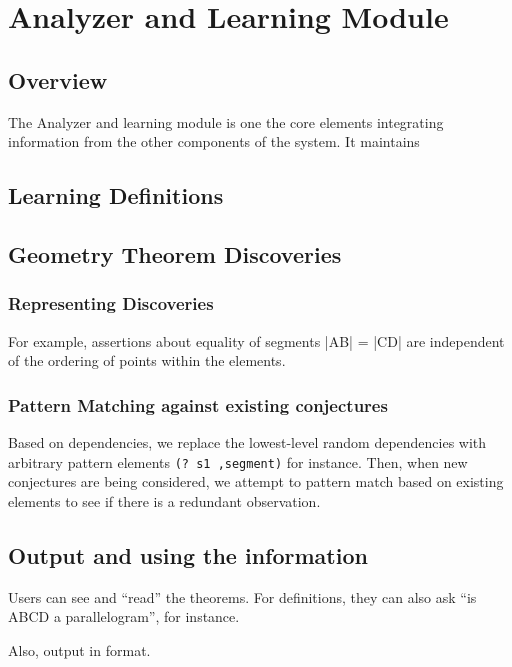\chapter{Analyzer and Learning Module}
\label{chap:analyzer}

\section{Overview}

The Analyzer and learning module is one the core elements integrating
information from the other components of the system. It maintains

\section{Learning Definitions}

\section{Geometry Theorem Discoveries}

\subsection{Representing Discoveries}

For example, assertions about equality of segments |AB| = |CD| are
independent of the ordering of points within the elements.

\subsection{Pattern Matching against existing conjectures}

Based on dependencies, we replace the lowest-level random dependencies
with arbitrary pattern elements \texttt{(? s1 ,segment)} for
instance. Then, when new conjectures are being considered, we attempt
to pattern match based on existing elements to see if there is a
redundant observation.

\section{Output and using the information}

Users can see and ``read'' the theorems. For definitions, they can
also ask ``is ABCD a parallelogram'', for instance.

Also, output in format.
